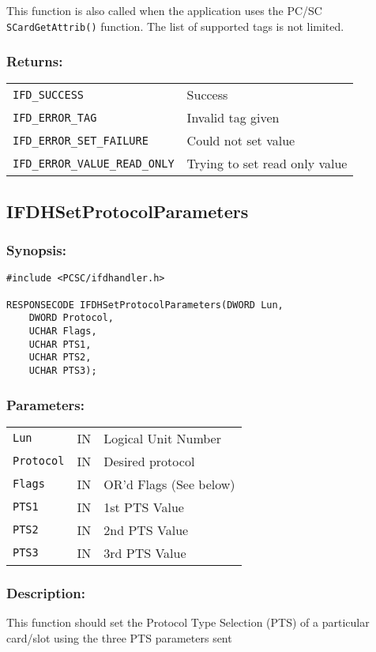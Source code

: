 \documentclass[a4paper,12pt]{article}
\newcommand{\synopsis}{\subsubsection{Synopsis:}}
\newcommand{\parameters}{\subsubsection{Parameters:}}
\newcommand{\desc}{\subsubsection{Description:}}
\newcommand{\returns}{\subsubsection{Returns:}}
\begin{document}
This function is also called when the application uses the PC/SC
\texttt{SCardGetAttrib()} function. The list of supported tags is not limited.

\returns

\begin{tabular}{ll}
\texttt{IFD\_SUCCESS} & Success\\
\texttt{IFD\_ERROR\_TAG} & Invalid tag given\\
\texttt{IFD\_ERROR\_SET\_FAILURE} & Could not set value\\
\texttt{IFD\_ERROR\_VALUE\_READ\_ONLY} & Trying to set read only value
\end{tabular}


\subsection{IFDHSetProtocolParameters}

\synopsis
\begin{verbatim}
#include <PCSC/ifdhandler.h>

RESPONSECODE IFDHSetProtocolParameters(DWORD Lun,
    DWORD Protocol,
    UCHAR Flags,
    UCHAR PTS1,
    UCHAR PTS2,
    UCHAR PTS3);
\end{verbatim}

\parameters

\begin{tabular}{lll}
\texttt{Lun} & IN & Logical Unit Number\\
\texttt{Protocol} & IN & Desired protocol\\
\texttt{Flags} & IN & OR'd Flags (See below)\\
\texttt{PTS1} & IN & 1st PTS Value\\
\texttt{PTS2} & IN & 2nd PTS Value\\
\texttt{PTS3} & IN & 3rd PTS Value\\
\end{tabular}

\desc

This function should set the Protocol Type Selection (PTS) of a
particular card/slot using the three PTS parameters sent
\end{document}
